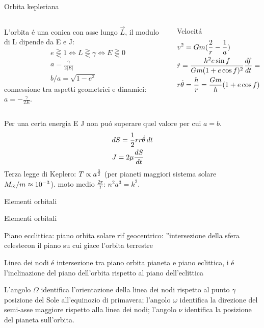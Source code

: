\begin{wordonframe}{Orbita kepleriana}
\begin{columns}[T]
\begin{column}{0.45\textwidth}
L'orbita \'e una conica con asse lungo $\vec{L}$, il modulo di L dipende da E e J:
\begin{align*}
&e\gtreqless1\Leftrightarrow L\gtreqless\gamma\Leftrightarrow E\gtreqless0\\
&a=\frac{\gamma}{2|E|}\\
&b/a=\sqrt{1-e^2}
\end{align*}
connessione tra aspetti geometrici e dinamici: $a=-\frac{\gamma}{2E}$.
\end{column}
\begin{column}{0.55\textwidth}
\begin{block}{Velocit\'a}
\begin{align*}
&v^2=Gm(\frac{2}{r}-\frac{1}{a})\\
&\dot{r}=\frac{h^2e\sin{f}}{Gm(1+e\cos{f})^2}\TDy{t}{f}=\frac{Gm}{h}e\sin{f}\\
&r\dot{\theta}=\frac{h}{r}=\frac{Gm}{h}(1+e\cos{f})
\end{align*}
\end{block}
\end{column}
\end{columns}
Per una certa energia E J non pu\'o superare quel valore per cui $a=b$.
\begin{align*}
&dS=\frac{1}{2}rr\dot{\theta}\,dt\\
&J=2\mu\TDy{t}{S}
\end{align*}
Terza legge di Keplero: $T\propto a\expy{\frac{3}{2}}$ (per pianeti maggiori sistema solare $\msun{}/m\approx\num{e-3}$).
moto medio $\frac{2\pi}{T}$: $n^2a^3=k^2$.
\end{wordonframe}


\begin{frame}{Elementi orbitali}



\end{frame}



\begin{wordonframe}{Elementi orbitali}

Piano ecclittica: piano orbita solare rif geocentrico: ''intersezione della sfera celestecon il piano su cui giace l'orbita terrestre

Linea dei nodi \'e intersezione tra piano orbita pianeta e piano eclittica, i \'e l'inclinazione del piano dell'orbita rispetto al piano dell'eclittica

L'angolo $\Omega$ identifica l'orientazione della linea dei nodi rispetto al punto $\gamma$ posizione del Sole all'equinozio di primavera; l'angolo $\omega$ identifica la direzione del semi-asse maggiore rispetto alla linea dei nodi; l'angolo $\nu$ identifica la posizione del pianeta sull'orbita.

\end{wordonframe}


